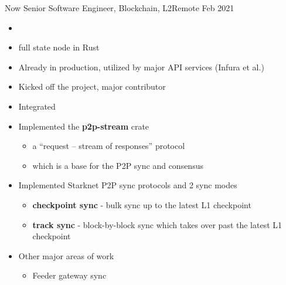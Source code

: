 %
%
%

\begin{experiences}
  \experience
    {Now}   {Senior Software Engineer, Blockchain, L2}{}{Remote}
    {Feb 2021}      {
                      \begin{itemize}
                        \item {}
                        \item {} full state node in Rust
                        \item Already in production, utilized by major API services (Infura et al.)
                        \item Kicked off the project, major contributor
                        \item Integrated  
                        \item Implemented the \textbf{p2p-stream} crate
                        \begin{itemize}
                          \item a “request – stream of responses” protocol
                          \item which is a base for the P2P sync and consensus
                        \end{itemize}
                        \item Implemented Starknet P2P sync protocols and 2 sync modes
                        \begin{itemize}
                          \item \textbf{checkpoint sync} - bulk sync up to the latest L1 checkpoint
                          \item \textbf{track sync} - block-by-block sync which takes over past the latest L1 checkpoint
                        \end{itemize}
                        \item Other major areas of work
                        \begin{itemize}
                          \item Feeder gateway sync

\end{itemize}
\end{itemize}}
\end{experiences}
